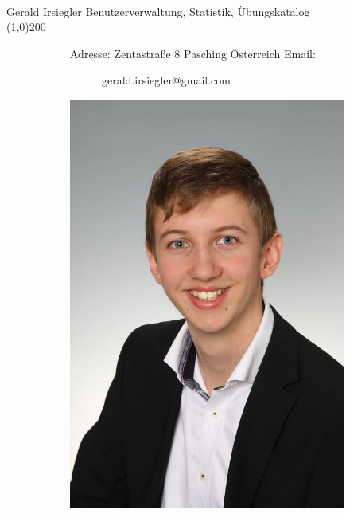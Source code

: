 \documentclass[FIPLY_base.tex]{subfiles}
\begin{document}
	\ \\
	{\Large Gerald Irsiegler} \newline
	Benutzerverwaltung, Statistik, Übungskatalog 
	\ \\
	\line(1,0){200}
	\begin{figure}[H]
		\begin{subfigure}[b]{0.3\textwidth}
			Adresse: \newline
			Zentastraße 8  Pasching \newline
			Österreich \newline
			\newline
			Email:
			\begin{subfigure}[b]{0.2\textwidth}
				gerald.irsiegler@gmail.com
			\end{subfigure}
		\end{subfigure}
		\hfil
		\begin{subfigure}[b]{0.2\textwidth}
			\includegraphics[scale=0.1]{img/gary}
		\end{subfigure}
	\end{figure}
\end{document}
